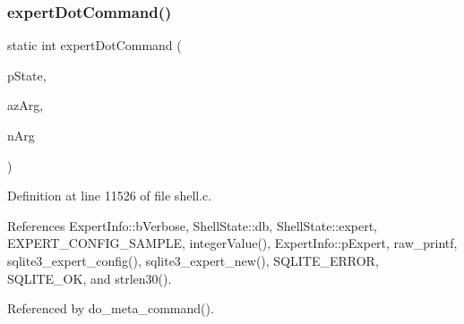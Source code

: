 \subsubsection{expert\+Dot\+Command()}
{\footnotesize\ttfamily static int expert\+Dot\+Command (\begin{DoxyParamCaption}\item[{\textbf{ Shell\+State} $\ast$}]{p\+State,  }\item[{char $\ast$$\ast$}]{az\+Arg,  }\item[{int}]{n\+Arg }\end{DoxyParamCaption})\hspace{0.3cm}{\ttfamily [static]}}



Definition at line 11526 of file shell.\+c.



References Expert\+Info\+::b\+Verbose, Shell\+State\+::db, Shell\+State\+::expert, E\+X\+P\+E\+R\+T\+\_\+\+C\+O\+N\+F\+I\+G\+\_\+\+S\+A\+M\+P\+LE, integer\+Value(), Expert\+Info\+::p\+Expert, raw\+\_\+printf, sqlite3\+\_\+expert\+\_\+config(), sqlite3\+\_\+expert\+\_\+new(), S\+Q\+L\+I\+T\+E\+\_\+\+E\+R\+R\+OR, S\+Q\+L\+I\+T\+E\+\_\+\+OK, and strlen30().



Referenced by do\+\_\+meta\+\_\+command().


